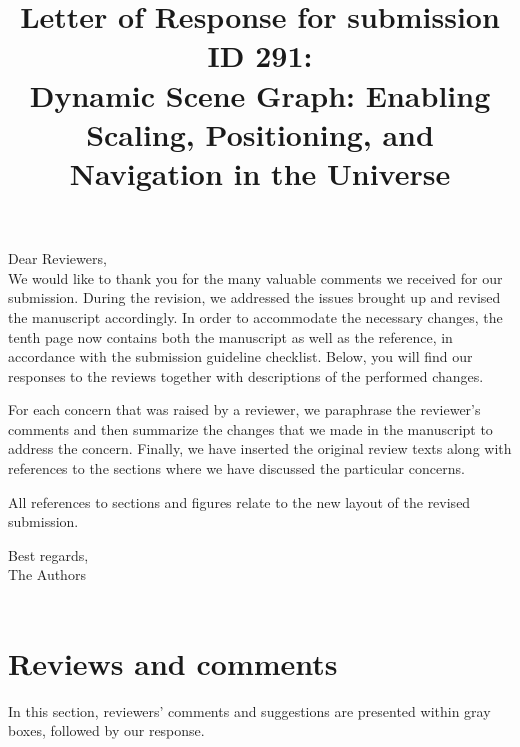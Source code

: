 \documentclass{article}
\date{}
\begin{document}
\title{Letter of Response for submission ID 291: \\Dynamic Scene Graph: Enabling Scaling, Positioning, and Navigation in the Universe}
\maketitle

Dear Reviewers, \\

We would like to thank you for the many valuable comments we received for our submission.
During the revision, we addressed the issues brought up and revised the manuscript accordingly.
In order to accommodate the necessary changes, the tenth page now contains both the manuscript as well as the reference, in accordance with the submission guideline checklist.
Below, you will find our responses to the reviews together with descriptions of the performed changes.

For each concern that was raised by a reviewer, we paraphrase the reviewer's comments and then summarize the changes that we made in the manuscript to address the concern.
Finally, we have inserted the original review texts along with references to the sections where we have discussed the particular concerns.

All references to sections and figures relate to the new layout of the revised submission.


Best regards, \\
The Authors \\\\

\newpage

\section{Reviews and comments}
In this section, reviewers' comments and suggestions are presented within gray boxes, followed by our response.

\vspace*{1cm}
\end{document}
